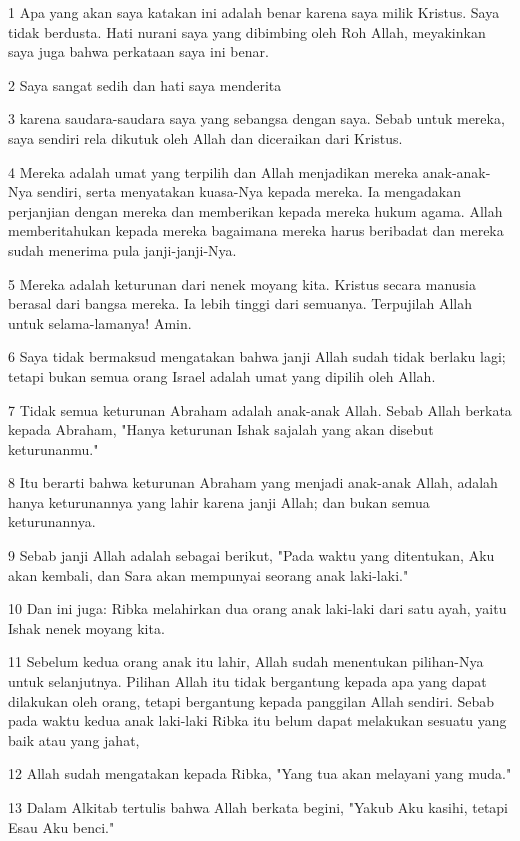 \par 1 Apa yang akan saya katakan ini adalah benar karena saya milik Kristus. Saya tidak berdusta. Hati nurani saya yang dibimbing oleh Roh Allah, meyakinkan saya juga bahwa perkataan saya ini benar.
\par 2 Saya sangat sedih dan hati saya menderita
\par 3 karena saudara-saudara saya yang sebangsa dengan saya. Sebab untuk mereka, saya sendiri rela dikutuk oleh Allah dan diceraikan dari Kristus.
\par 4 Mereka adalah umat yang terpilih dan Allah menjadikan mereka anak-anak-Nya sendiri, serta menyatakan kuasa-Nya kepada mereka. Ia mengadakan perjanjian dengan mereka dan memberikan kepada mereka hukum agama. Allah memberitahukan kepada mereka bagaimana mereka harus beribadat dan mereka sudah menerima pula janji-janji-Nya.
\par 5 Mereka adalah keturunan dari nenek moyang kita. Kristus secara manusia berasal dari bangsa mereka. Ia lebih tinggi dari semuanya. Terpujilah Allah untuk selama-lamanya! Amin.
\par 6 Saya tidak bermaksud mengatakan bahwa janji Allah sudah tidak berlaku lagi; tetapi bukan semua orang Israel adalah umat yang dipilih oleh Allah.
\par 7 Tidak semua keturunan Abraham adalah anak-anak Allah. Sebab Allah berkata kepada Abraham, "Hanya keturunan Ishak sajalah yang akan disebut keturunanmu."
\par 8 Itu berarti bahwa keturunan Abraham yang menjadi anak-anak Allah, adalah hanya keturunannya yang lahir karena janji Allah; dan bukan semua keturunannya.
\par 9 Sebab janji Allah adalah sebagai berikut, "Pada waktu yang ditentukan, Aku akan kembali, dan Sara akan mempunyai seorang anak laki-laki."
\par 10 Dan ini juga: Ribka melahirkan dua orang anak laki-laki dari satu ayah, yaitu Ishak nenek moyang kita.
\par 11 Sebelum kedua orang anak itu lahir, Allah sudah menentukan pilihan-Nya untuk selanjutnya. Pilihan Allah itu tidak bergantung kepada apa yang dapat dilakukan oleh orang, tetapi bergantung kepada panggilan Allah sendiri. Sebab pada waktu kedua anak laki-laki Ribka itu belum dapat melakukan sesuatu yang baik atau yang jahat,
\par 12 Allah sudah mengatakan kepada Ribka, "Yang tua akan melayani yang muda."
\par 13 Dalam Alkitab tertulis bahwa Allah berkata begini, "Yakub Aku kasihi, tetapi Esau Aku benci."
